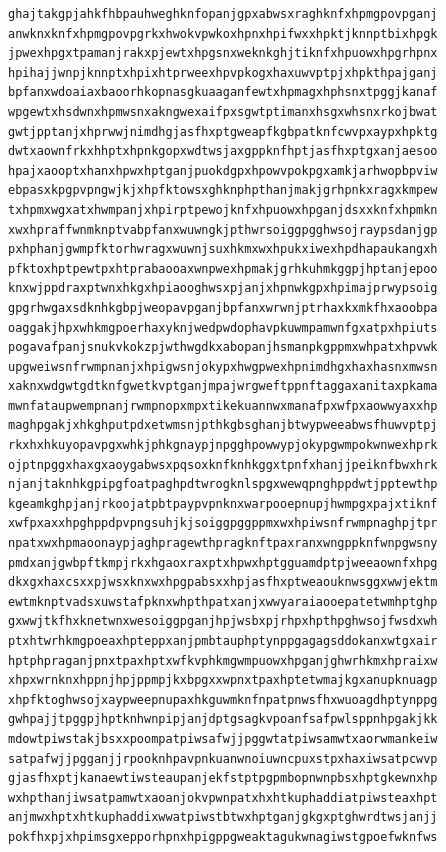 \documentclass[11pt,letterpaper]{exam}
\begin{document}
\begin{questions}
\begin{verbatim}
ghajtakgpjahkfhbpauhweghknfopanjgpxabwsxraghknfxhpmgpovpganj
anwknxknfxhpmgpovpgrkxhwokvpwkoxhpnxhpifwxxhpktjknnptbixhpgk
jpwexhpgxtpamanjrakxpjewtxhpgsnxweknkghjtiknfxhpuowxhpgrhpnx
hpihajjwnpjknnptxhpixhtprweexhpvpkogxhaxuwvptpjxhpkthpajganj
bpfanxwdoaiaxbaoorhkopnasgkuaaganfewtxhpmagxhphsnxtpggjkanaf
wpgewtxhsdwnxhpmwsnxakngwexaifpxsgwtptimanxhsgxwhsnxrkojbwat
gwtjpptanjxhprwwjnimdhgjasfhxptgweapfkgbpatknfcwvpxaypxhpktg
dwtxaownfrkxhhptxhpnkgopxwdtwsjaxgppknfhptjasfhxptgxanjaesoo
hpajxaooptxhanxhpwxhptganjpuokdgpxhpowvpokpgxamkjarhwopbpviw
ebpasxkpgpvpngwjkjxhpfktowsxghknphpthanjmakjgrhpnkxragxkmpew
txhpmxwgxatxhwmpanjxhpirptpewojknfxhpuowxhpganjdsxxknfxhpmkn
xwxhpraffwnmknptvabpfanxwuwngkjpthwrsoiggpgghwsojraypsdanjgp
pxhphanjgwmpfktorhwragxwuwnjsuxhkmxwxhpukxiwexhpdhapaukangxh
pfktoxhptpewtpxhtprabaooaxwnpwexhpmakjgrhkuhmkggpjhptanjepoo
knxwjppdraxptwnxhkgxhpiaooghwsxpjanjxhpnwkgpxhpimajprwypsoig
gpgrhwgaxsdknhkgbpjweopavpganjbpfanxwrwnjptrhaxkxmkfhxaoobpa
oaggakjhpxwhkmgpoerhaxyknjwedpwdophavpkuwmpamwnfgxatpxhpiuts
pogavafpanjsnukvkokzpjwthwgdkxabopanjhsmanpkgppmxwhpatxhpvwk
upgweiwsnfrwmpnanjxhpigwsnjokypxhwgpwexhpnimdhgxhaxhasnxmwsn
xaknxwdgwtgdtknfgwetkvptganjmpajwrgweftppnftaggaxanitaxpkama
mwnfataupwempnanjrwmpnopxmpxtikekuannwxmanafpxwfpxaowwyaxxhp
maghpgakjxhkghputpdxetwmsnjpthkgbsghanjbtwypweeabwsfhuwvptpj
rkxhxhkuyopavpgxwhkjphkgnaypjnpgghpowwypjokypgwmpokwnwexhprk
ojptnpggxhaxgxaoygabwsxpqsoxknfknhkggxtpnfxhanjjpeiknfbwxhrk
njanjtaknhkgpipgfoatpaghpdtwrogknlspgxwewqpnghppdwtjpptewthp
kgeamkghpjanjrkoojatpbtpaypvpnknxwarpooepnupjhwmpgxpajxtiknf
xwfpxaxxhpghppdpvpngsuhjkjsoiggpggppmxwxhpiwsnfrwmpnaghpjtpr
npatxwxhpmaoonaypjaghpragewthpragknftpaxranxwngppknfwnpgwsny
pmdxanjgwbpftkmpjrkxhgaoxraxptxhpwxhptgguamdptpjweeaownfxhpg
dkxgxhaxcsxxpjwsxknxwxhpgpabsxxhpjasfhxptweaouknwsggxwwjektm
ewtmknptvadsxuwstafpknxwhpthpatxanjxwwyaraiaooepatetwmhptghp
gxwwjtkfhxknetwnxwesoiggpganjhpjwsbxpjrhpxhpthpghwsojfwsdxwh
ptxhtwrhkmgpoeaxhpteppxanjpmbtauphptynppgagagsddokanxwtgxair
hptphpraganjpnxtpaxhptxwfkvphkmgwmpuowxhpganjghwrhkmxhpraixw
xhpxwrnknxhppnjhpjppmpjkxbpgxxwpnxtpaxhptetwmajkgxanupknuagp
xhpfktoghwsojxaypweepnupaxhkguwmknfnpatpnwsfhxwuoagdhptynppg
gwhpajjtpggpjhptknhwnpipjanjdptgsagkvpoanfsafpwlsppnhpgakjkk
mdowtpiwstakjbsxxpoompatpiwsafwjjpggwtatpiwsamwtxaorwmankeiw
satpafwjjpgganjjrpooknhpavpnkuanwnoiuwncpuxstpxhaxiwsatpcwvp
gjasfhxptjkanaewtiwsteaupanjekfstptpgpmbopnwnpbsxhptgkewnxhp
wxhpthanjiwsatpamwtxaoanjokvpwnpatxhxhtkuphaddiatpiwsteaxhpt
anjmwxhptxhtkuphaddixwwatpiwstbtwxhptganjgkgxptghwrdtwsjanjj
pokfhxpjxhpimsgxepporhpnxhpigppgweaktagukwnagiwstgpoefwknfws

\end{verbatim}
\end{questions}
\end{document}
